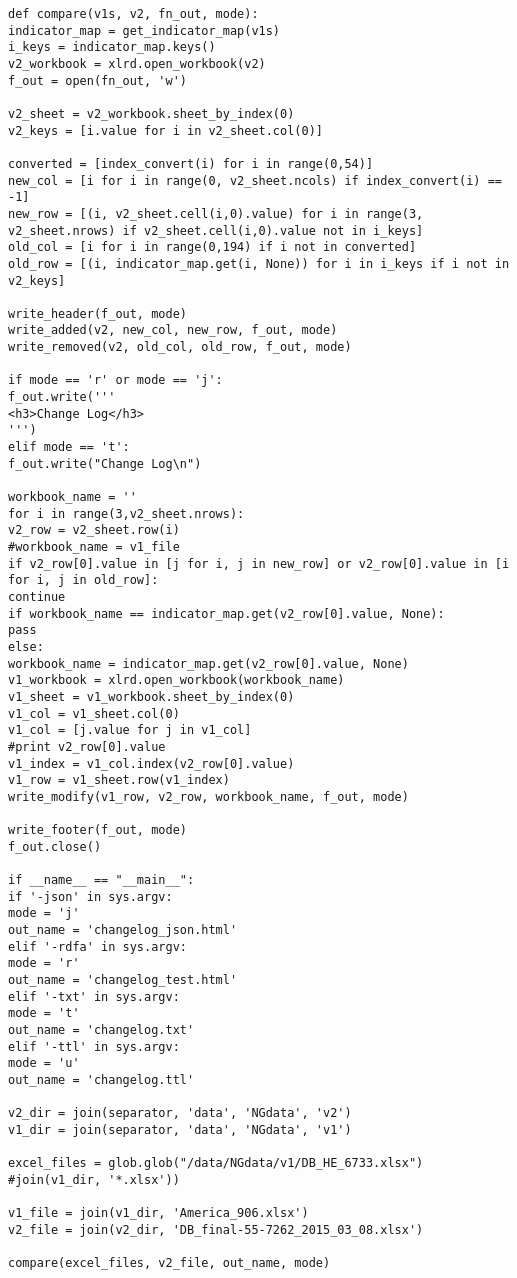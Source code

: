 \begin{verbatim}
def compare(v1s, v2, fn_out, mode):
indicator_map = get_indicator_map(v1s)
i_keys = indicator_map.keys()
v2_workbook = xlrd.open_workbook(v2)
f_out = open(fn_out, 'w')

v2_sheet = v2_workbook.sheet_by_index(0)
v2_keys = [i.value for i in v2_sheet.col(0)]

converted = [index_convert(i) for i in range(0,54)]
new_col = [i for i in range(0, v2_sheet.ncols) if index_convert(i) == -1]
new_row = [(i, v2_sheet.cell(i,0).value) for i in range(3, v2_sheet.nrows) if v2_sheet.cell(i,0).value not in i_keys]
old_col = [i for i in range(0,194) if i not in converted]
old_row = [(i, indicator_map.get(i, None)) for i in i_keys if i not in v2_keys]

write_header(f_out, mode)
write_added(v2, new_col, new_row, f_out, mode)
write_removed(v2, old_col, old_row, f_out, mode)

if mode == 'r' or mode == 'j':
f_out.write('''
<h3>Change Log</h3>
''')
elif mode == 't':
f_out.write("Change Log\n")

workbook_name = ''
for i in range(3,v2_sheet.nrows):
v2_row = v2_sheet.row(i)
#workbook_name = v1_file
if v2_row[0].value in [j for i, j in new_row] or v2_row[0].value in [i for i, j in old_row]:
continue
if workbook_name == indicator_map.get(v2_row[0].value, None):
pass
else:
workbook_name = indicator_map.get(v2_row[0].value, None)
v1_workbook = xlrd.open_workbook(workbook_name)
v1_sheet = v1_workbook.sheet_by_index(0)
v1_col = v1_sheet.col(0)
v1_col = [j.value for j in v1_col]
#print v2_row[0].value
v1_index = v1_col.index(v2_row[0].value)
v1_row = v1_sheet.row(v1_index)
write_modify(v1_row, v2_row, workbook_name, f_out, mode)

write_footer(f_out, mode)
f_out.close()

if __name__ == "__main__":
if '-json' in sys.argv:
mode = 'j'
out_name = 'changelog_json.html'
elif '-rdfa' in sys.argv:
mode = 'r'
out_name = 'changelog_test.html'
elif '-txt' in sys.argv:
mode = 't'
out_name = 'changelog.txt'
elif '-ttl' in sys.argv:
mode = 'u'
out_name = 'changelog.ttl'

v2_dir = join(separator, 'data', 'NGdata', 'v2')
v1_dir = join(separator, 'data', 'NGdata', 'v1')

excel_files = glob.glob("/data/NGdata/v1/DB_HE_6733.xlsx") #join(v1_dir, '*.xlsx'))

v1_file = join(v1_dir, 'America_906.xlsx')
v2_file = join(v2_dir, 'DB_final-55-7262_2015_03_08.xlsx')

compare(excel_files, v2_file, out_name, mode)
\end{verbatim}

